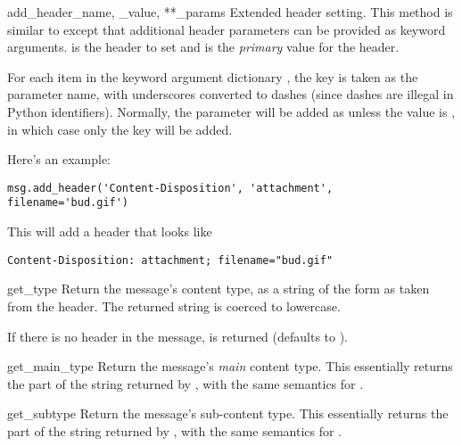 \begin{methoddesc}[Message]{add_header}{_name, _value, **_params}
Extended header setting.  This method is similar to
 except that additional header parameters can be
provided as keyword arguments.   is the header to set and
 is the \emph{primary} value for the header.

For each item in the keyword argument dictionary , the
key is taken as the parameter name, with underscores converted to
dashes (since dashes are illegal in Python identifiers).  Normally,
the parameter will be added as  unless the value is
, in which case only the key will be added.

Here's an example:

\begin{verbatim}
msg.add_header('Content-Disposition', 'attachment', filename='bud.gif')
\end{verbatim}

This will add a header that looks like

\begin{verbatim}
Content-Disposition: attachment; filename="bud.gif"
\end{verbatim}
\end{methoddesc}

\begin{methoddesc}[Message]{get_type}{}
Return the message's content type, as a string of the form
 as taken from the
 header.
The returned string is coerced to lowercase.

If there is no  header in the message,
 is returned (defaults to ).
\end{methoddesc}

\begin{methoddesc}[Message]{get_main_type}{}
Return the message's \emph{main} content type.  This essentially returns the
 part of the string returned by , with the
same semantics for .
\end{methoddesc}

\begin{methoddesc}[Message]{get_subtype}{}
Return the message's sub-content type.  This essentially returns the
 part of the string returned by , with the
same semantics for .
\end{methoddesc}

